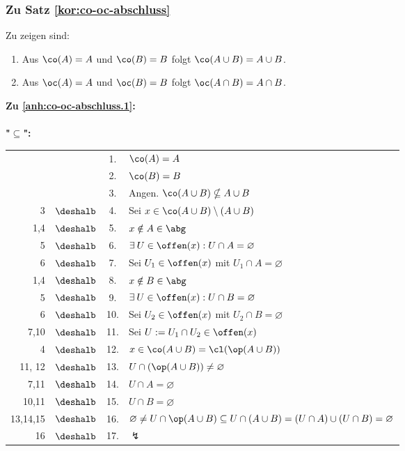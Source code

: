\subsubsection{Zu Satz \ref{kor:co-oc-abschluss}}\label{anh:co-oc-abschluss}
    Zu zeigen sind:
    \begin{enumerate}
        \item \label{anh:co-oc-abschluss.1} Aus $\co(A) = A$ und $\co(B) = B$ folgt $\co(A \cup B) = A \cup B$.
        \item \label{anh:co-oc-abschluss.2} Aus $\oc(A) = A$ und $\oc(B) = B$ folgt $\oc(A \cap B) = A \cap B$.
    \end{enumerate}

    \noindent
    \textbf{Zu \ref{anh:co-oc-abschluss.1}:}
    \\ \ \\
    \textbf{"$\boldsymbol{\subseteq}$":}
    \begin{longtable}{r c c l}
        & & 1. & $\co(A) = A$ \\
        & & 2. & $\co(B) = B$ \\
        & & 3. & Angen. $\co(A \cup B) \nsubseteq A \cup B$ \\
        3 & $\deshalb$ & 4. & Sei $x \in \co(A \cup B) \setminus (A \cup B)$ \\
        1,4 & $\deshalb$ & 5. & $x \notin A \in \abg$  \\
        5 & $\deshalb$ & 6. & $\exists\: U \in \offen(x) : U \cap A = \varnothing$  \\
        6 & $\deshalb$ & 7. & Sei $U_1 \in \offen(x)$ mit $U_1 \cap A = \varnothing$  \\
        1,4 & $\deshalb$ & 8. & $x \notin B \in \abg$  \\
        5 & $\deshalb$ & 9. & $\exists\: U \in \offen(x) : U \cap B = \varnothing$  \\
        6 & $\deshalb$ & 10. & Sei $U_2 \in \offen(x)$ mit $U_2 \cap B = \varnothing$  \\
        7,10 & $\deshalb$ & 11. & Sei $U := U_1 \cap U_2 \in \offen(x)$ \\
        4 & $\deshalb$ & 12. & $x \in \co(A \cup B) = \cl(\op(A \cup B))$  \\
        11, 12 & $\deshalb$ & 13. & $U \cap (\op(A \cup B)) \neq \varnothing$  \\
        7,11 & $\deshalb$ & 14. & $U \cap A = \varnothing$  \\
        10,11 & $\deshalb$ & 15. & $U \cap B = \varnothing$  \\
        13,14,15 & $\deshalb$ & 16. & $\varnothing \neq U \cap \op(A \cup B) \subseteq U \cap (A \cup B) = (U \cap A) \cup (U\cap B) = \varnothing$  \\
        16 & $\deshalb$ & 17. & $\lightning$  \\
    \end{longtable}
